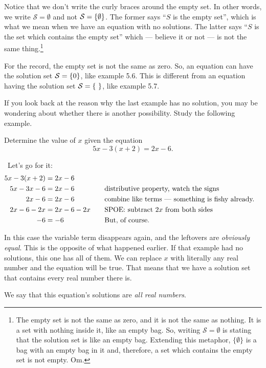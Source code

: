 Notice that we don't write the curly braces around the empty set. In other words, we write $\mathcal{S}=\emptyset$ and not $\mathcal{S}=\left\{\emptyset\right\}$. The former says ``$S$ is the empty set'', which is what we mean when we have an equation with no solutions. The latter says ``$S$ is the set which contains the empty set'' which --- believe it or not --- is not the same thing.\footnote{The empty set is not the same as zero, and it is not the same as nothing. It is a set with nothing inside it, like an empty bag. So, writing $\mathcal{S} = \emptyset$ is stating that the solution set is like an empty bag. Extending this metaphor, $\{\emptyset\}$ is a bag with an empty bag in it and, therefore, a set which contains the empty set is not empty. Om.}

For the record, the empty set is not the same as zero. So, an equation can have the solution set $\mathcal{S}=\left\{0\right\}$, like example 5.6. This is different from an equation having the solution set $\mathcal{S}=\left\{~\right\}$, like example 5.7.

If you look back at the reason why the last example has no solution, you may be wondering about whether there is another possibility. Study the following example.

\begin{boxedex}
Determine the value of $x$ given the equation \[5x-3(x+2)=2x-6.\]

\exsoln\ Let's go for it:
\[\begin{aligned}
5x-3(x+2) &= 2x-6\\
5x-3x-6 &= 2x-6
&&\text{\quad distributive property, watch the signs}\\
2x-6 &= 2x-6
&&\text{\quad combine like terms --- something is fishy already.}\\
2x-6-2x &= 2x-6-2x
&&\text{\quad SPOE: subtract $2x$ from both sides}\\
-6 &= -6
&&\text{\quad But, of course.}\\
\end{aligned}\]

In this case the variable term disappears again, and the leftovers are \textit{obviously equal}. This is the opposite of what happened earlier. If that example had no solutions, this one has all of them. We can replace $x$ with literally any real number and the equation will be true. That means that we have a solution set that contains every real number there is.

We say that this equation's solutions are \textit{all real numbers}.
\end{boxedex}

